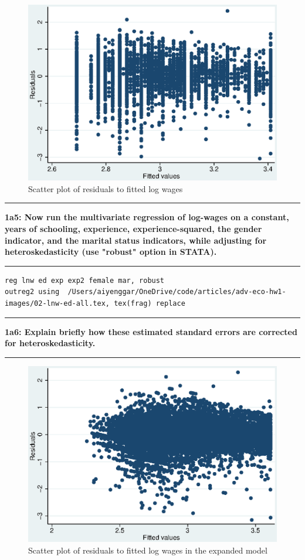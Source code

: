 \documentclass[12pt]{article}
\newcommand\question[2]{\vspace{1em}\hrule\vspace{1em}\textbf{#1: #2}\vspace{1em}\hrule\vspace{1em}}
\begin{document}
\begin{figure}[h]
\begin{centering}
  \includegraphics[width=\textwidth]{german-res-fit}
  \caption{Scatter plot of residuals to fitted log wages}
   \label{fig:german-res-fit}
\end{centering}
\end{figure}

\question{1a5}{Now run the multivariate regression of log-wages on a constant, years of schooling, experience, experience-squared, the gender indicator, and the marital status indicators, while adjusting for heteroskedasticity (use "robust" option in STATA).}
\begin{lstlisting}
reg lnw ed exp exp2 female mar, robust
outreg2 using  /Users/aiyenggar/OneDrive/code/articles/adv-eco-hw1-images/02-lnw-ed-all.tex, tex(frag) replace
\end{lstlisting}


\question{1a6}{Explain briefly how these estimated standard errors are corrected for heteroskedasticity. }
\begin{figure}[h]
\begin{centering}
  \includegraphics[width=\textwidth]{german-res-fit2}
  \caption{Scatter plot of residuals to fitted log wages in the expanded model}
   \label{fig:german-res-fit2}
\end{centering}
\end{figure}
\end{document}
